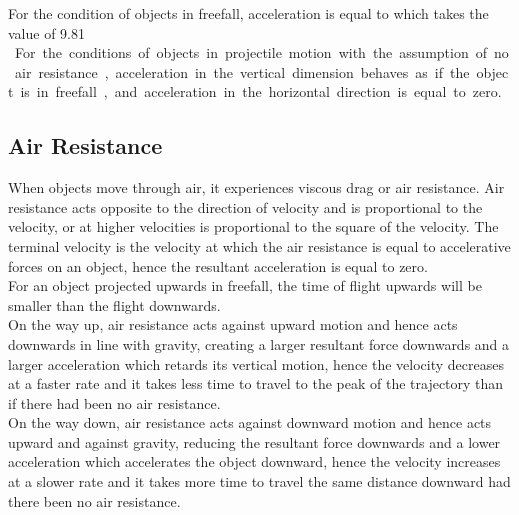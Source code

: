 \documentclass[../main]{subfiles}
\begin{document}
	For the condition of objects in freefall, acceleration is equal to which takes the value of 9.81 \si{\m\per\s\square}.For the conditions of objects in projectile motion with the assumption of no air resistance, acceleration in the vertical dimension behaves as if the object is in freefall, and acceleration in the horizontal direction is equal to zero.

	\subsection{Air Resistance}

	When objects move through air, it experiences viscous drag or air resistance. Air resistance acts opposite to the direction of velocity and is proportional to the velocity, or at higher velocities is proportional to the square of the velocity. The terminal velocity is the velocity at which the air resistance is equal to accelerative forces on an object, hence the resultant acceleration is equal to zero. \\

	For an object projected upwards in freefall, the time of flight upwards will be smaller than the flight downwards. \\

	On the way up, air resistance acts against upward motion and hence acts downwards in line with gravity, creating a larger resultant force downwards and a larger acceleration which retards its vertical motion, hence the velocity decreases at a faster rate and it takes less time to travel to the peak of the trajectory than if there had been no air resistance. \\

	On the way down, air resistance acts against downward motion and hence acts upward and against gravity, reducing the resultant force downwards and a lower acceleration which accelerates the object downward, hence the velocity increases at a slower rate and it takes more time to travel the same distance downward had there been no air resistance.
\end{document}
